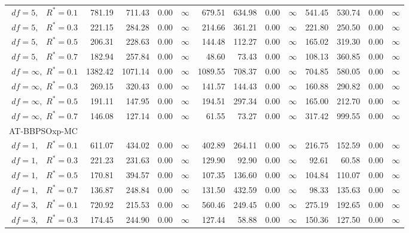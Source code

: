 \documentclass[12pt]{article}
\begin{document}
\begin{table}[ht]
{\begin{tabular}{r|rrrr|rrrr|rrrr}
  $df = 5,\enspace$ $R^* =0.1$ & 781.19 & 711.43 & 0.00 & $\infty$ & 679.51 & 634.98 & 0.00 & $\infty$ & 541.45 & 530.74 & 0.00 & $\infty$ \\ 
  $df = 5,\enspace$ $R^* =0.3$ & 221.15 & 284.28 & 0.00 & $\infty$ & 214.66 & 361.21 & 0.00 & $\infty$ & 221.80 & 250.50 & 0.00 & $\infty$ \\ 
  $df = 5,\enspace$ $R^* =0.5$ & 206.31 & 228.63 & 0.00 & $\infty$ & 144.48 & 112.27 & 0.00 & $\infty$ & 165.02 & 319.30 & 0.00 & $\infty$ \\ 
  $df = 5,\enspace$ $R^* =0.7$ & 182.94 & 257.84 & 0.00 & $\infty$ & 48.60 & 73.43 & 0.00 & $\infty$ & 108.13 & 360.85 & 0.00 & $\infty$ \\ 
  $df = \infty,$ $R^* =0.1$ & 1382.42 & 1071.14 & 0.00 & $\infty$ & 1089.55 & 708.37 & 0.00 & $\infty$ & 704.85 & 580.05 & 0.00 & $\infty$ \\ 
  $df = \infty,$ $R^* =0.3$ & 269.15 & 320.43 & 0.00 & $\infty$ & 141.57 & 144.43 & 0.00 & $\infty$ & 160.88 & 290.82 & 0.00 & $\infty$ \\ 
  $df = \infty,$ $R^* =0.5$ & 191.11 & 147.95 & 0.00 & $\infty$ & 194.51 & 297.34 & 0.00 & $\infty$ & 165.00 & 212.70 & 0.00 & $\infty$ \\ 
  $df = \infty,$ $R^* =0.7$ & 146.08 & 127.14 & 0.00 & $\infty$ & 61.55 & 73.27 & 0.00 & $\infty$ & 317.42 & 999.55 & 0.00 & $\infty$ \\ 
\hline
\multicolumn{1}{l|}{AT-BBPSOxp-MC} &&&&&&&&&&&&\\
  $df = 1,\enspace$ $R^* =0.1$ & 611.07 & 434.02 & 0.00 & $\infty$ & 402.89 & 264.11 & 0.00 & $\infty$ & 216.75 & 152.59 & 0.00 & $\infty$ \\ 
  $df = 1,\enspace$ $R^* =0.3$ & 221.23 & 231.63 & 0.00 & $\infty$ & 129.90 & 92.90 & 0.00 & $\infty$ & 92.61 & 60.58 & 0.00 & $\infty$ \\ 
  $df = 1,\enspace$ $R^* =0.5$ & 170.81 & 394.57 & 0.00 & $\infty$ & 107.35 & 136.60 & 0.00 & $\infty$ & 104.84 & 110.07 & 0.00 & $\infty$ \\ 
  $df = 1,\enspace$ $R^* =0.7$ & 136.87 & 248.84 & 0.00 & $\infty$ & 131.50 & 432.59 & 0.00 & $\infty$ & 98.33 & 135.63 & 0.00 & $\infty$ \\ 
  $df = 3,\enspace$ $R^* =0.1$ & 720.92 & 215.53 & 0.00 & $\infty$ & 560.46 & 249.45 & 0.00 & $\infty$ & 275.19 & 192.65 & 0.00 & $\infty$ \\ 
  $df = 3,\enspace$ $R^* =0.3$ & 174.45 & 244.90 & 0.00 & $\infty$ & 127.44 & 58.88 & 0.00 & $\infty$ & 150.36 & 127.50 & 0.00 & $\infty$ \\ 

\end{tabular}}
\end{table}
\end{document}
